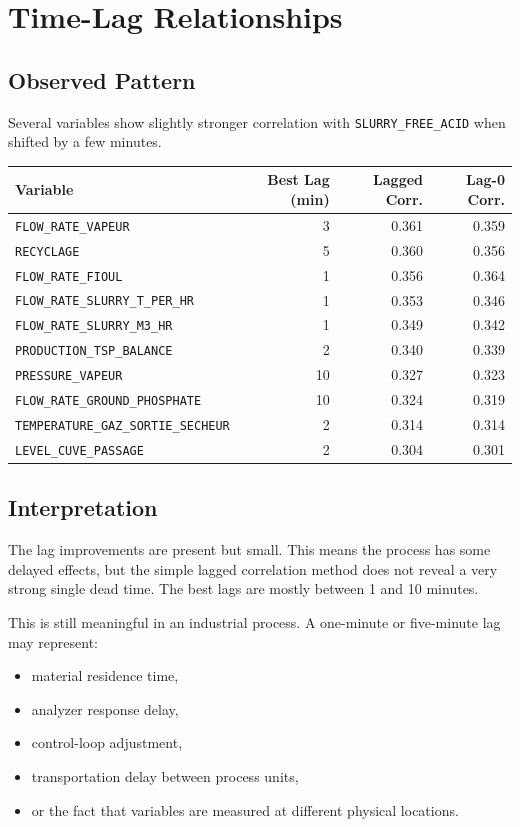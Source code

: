 \documentclass[11pt,a4paper]{article}
\begin{document}
\section{Time-Lag Relationships}

\subsection{Observed Pattern}

Several variables show slightly stronger correlation with \texttt{SLURRY\_FREE\_ACID} when shifted by a few minutes.

\begin{longtable}{p{8cm}rrr}
\toprule
Variable & Best Lag (min) & Lagged Corr. & Lag-0 Corr. \\
\midrule
\texttt{FLOW\_RATE\_VAPEUR} & 3 & 0.361 & 0.359 \\
\texttt{RECYCLAGE} & 5 & 0.360 & 0.356 \\
\texttt{FLOW\_RATE\_FIOUL} & 1 & 0.356 & 0.364 \\
\texttt{FLOW\_RATE\_SLURRY\_T\_PER\_HR} & 1 & 0.353 & 0.346 \\
\texttt{FLOW\_RATE\_SLURRY\_M3\_HR} & 1 & 0.349 & 0.342 \\
\texttt{PRODUCTION\_TSP\_BALANCE} & 2 & 0.340 & 0.339 \\
\texttt{PRESSURE\_VAPEUR} & 10 & 0.327 & 0.323 \\
\texttt{FLOW\_RATE\_GROUND\_PHOSPHATE} & 10 & 0.324 & 0.319 \\
\texttt{TEMPERATURE\_GAZ\_SORTIE\_SECHEUR} & 2 & 0.314 & 0.314 \\
\texttt{LEVEL\_CUVE\_PASSAGE} & 2 & 0.304 & 0.301 \\
\bottomrule
\end{longtable}

\subsection{Interpretation}

The lag improvements are present but small. This means the process has some delayed effects, but the simple lagged correlation method does not reveal a very strong single dead time. The best lags are mostly between 1 and 10 minutes.

This is still meaningful in an industrial process. A one-minute or five-minute lag may represent:

\begin{itemize}
    \item material residence time,
    \item analyzer response delay,
    \item control-loop adjustment,
    \item transportation delay between process units,
    \item or the fact that variables are measured at different physical locations.
\end{itemize}
\end{document}
